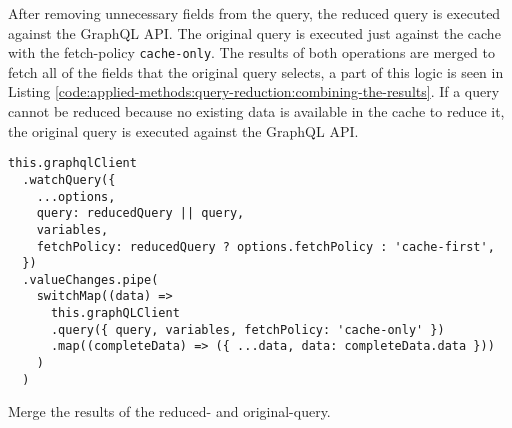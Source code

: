\noindent After removing unnecessary fields from the query, the reduced query is executed against the GraphQL \ac{API}. The original query is executed just against the cache with the fetch-policy \texttt{cache-only}. The results of both operations are merged to fetch all of the fields that the original query selects, a part of this logic is seen in Listing \ref{code:applied-methods:query-reduction:combining-the-results}. If a query cannot be reduced because no existing data is available in the cache to reduce it, the original query is executed against the GraphQL \ac{API}.

\ifshowListings
\begin{listing}[H]
\begin{verbatim}
this.graphqlClient
  .watchQuery({
    ...options,
    query: reducedQuery || query,
    variables,
    fetchPolicy: reducedQuery ? options.fetchPolicy : 'cache-first',
  })
  .valueChanges.pipe(
    switchMap((data) =>
      this.graphQLClient
      .query({ query, variables, fetchPolicy: 'cache-only' })
      .map((completeData) => ({ ...data, data: completeData.data }))
    )
  )
\end{verbatim}
\caption{Merge the results of the reduced- and original-query.}\label{code:applied-methods:query-reduction:combining-the-results}
\end{listing}
\fi
